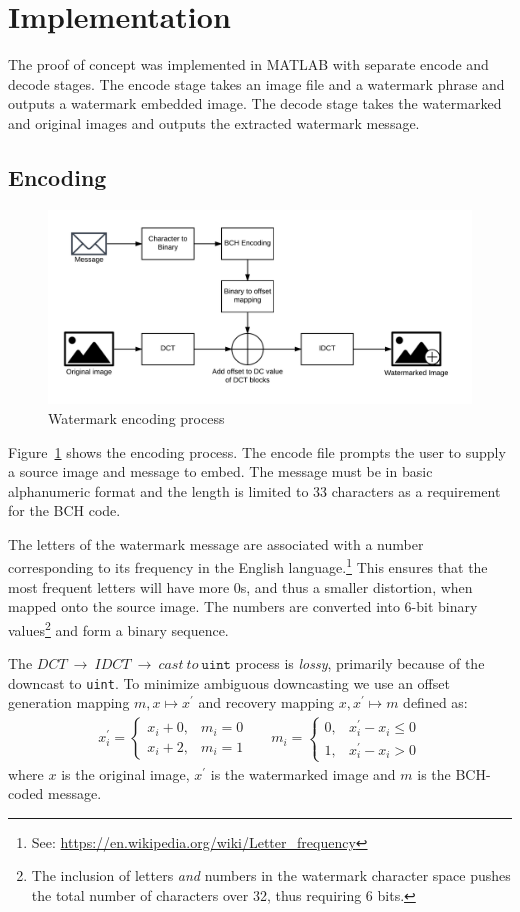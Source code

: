 \section{Implementation}\label{sec:impl}
The proof of concept was implemented in MATLAB with separate encode and decode stages.
The encode stage takes an image file and a watermark phrase and outputs a watermark embedded image.
The decode stage takes the watermarked and original images and outputs the extracted watermark message.

\subsection{Encoding}\label{sec:enc}
\begin{figure}[tbph]
  \centering
  \includegraphics[width=0.75\linewidth]{graphics/encode}
  \caption{Watermark encoding process}
  \label{fig:encode}
\end{figure}

Figure~\ref{fig:encode} shows the encoding process.
The encode file prompts the user to supply a source image and message to embed.
The message must be in basic alphanumeric format and the length is limited to 33 characters as a requirement for the BCH code.

The letters of the watermark message are associated with a number corresponding to its frequency in the English language.\footnote{See: \url{https://en.wikipedia.org/wiki/Letter_frequency}}
This ensures that the most frequent letters will have more 0s, and thus a smaller distortion, when mapped onto the source image.
The numbers are converted into 6-bit binary values\footnote{The inclusion of letters \textit{and} numbers in the watermark character space pushes the total number of characters over 32, thus requiring 6 bits.} and form a binary sequence.

The $DCT~\rightarrow~IDCT~\rightarrow~cast~to~\texttt{uint}$ process is \textit{lossy}, primarily because of the downcast to \texttt{uint}.
To minimize ambiguous downcasting we use an offset generation mapping $m,x \mapsto x^{\prime}$ and recovery mapping $ x,x^{\prime} \mapsto m$ defined as:
\begin{align*}
x^{\prime}_i = \begin{cases}
x_i + 0, & m_i = 0\\
x_i + 2, & m_i = 1
\end{cases}
&&
m_i = \begin{cases}
0, & x^{\prime}_i - x_i \le 0 \\
1, & x^{\prime}_i - x_i> 0
\end{cases}
\end{align*}
where $x$ is the original image, $x^{\prime}$ is the watermarked image and $m$ is the BCH-coded message.

